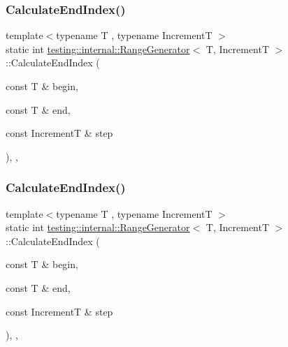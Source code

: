 \subsubsection{\texorpdfstring{CalculateEndIndex()}{CalculateEndIndex()}\hspace{0.1cm}{\footnotesize\ttfamily [2/3]}}
{\footnotesize\ttfamily template$<$typename T , typename IncrementT $>$ \\
static int \mbox{\hyperlink{classtesting_1_1internal_1_1_range_generator}{testing\+::internal\+::\+Range\+Generator}}$<$ T, IncrementT $>$\+::Calculate\+End\+Index (\begin{DoxyParamCaption}\item[{const T \&}]{begin,  }\item[{const T \&}]{end,  }\item[{const IncrementT \&}]{step }\end{DoxyParamCaption})\hspace{0.3cm}{\ttfamily [inline]}, {\ttfamily [static]}, {\ttfamily [private]}}

\mbox{\label{classtesting_1_1internal_1_1_range_generator_af617ad3b3e40bef967f1055dc7ae8ae6}} 
\subsubsection{\texorpdfstring{CalculateEndIndex()}{CalculateEndIndex()}\hspace{0.1cm}{\footnotesize\ttfamily [3/3]}}
{\footnotesize\ttfamily template$<$typename T , typename IncrementT $>$ \\
static int \mbox{\hyperlink{classtesting_1_1internal_1_1_range_generator}{testing\+::internal\+::\+Range\+Generator}}$<$ T, IncrementT $>$\+::Calculate\+End\+Index (\begin{DoxyParamCaption}\item[{const T \&}]{begin,  }\item[{const T \&}]{end,  }\item[{const IncrementT \&}]{step }\end{DoxyParamCaption})\hspace{0.3cm}{\ttfamily [inline]}, {\ttfamily [static]}, {\ttfamily [private]}}


